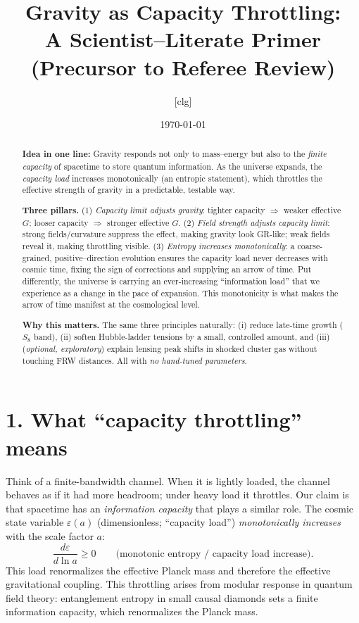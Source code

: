 \documentclass[aps,prd,onecolumn,superscriptaddress,nofootinbib]{revtex4-2}
\newcommand{\eps}{\varepsilon}
\begin{document}
\title{Gravity as Capacity Throttling:\\
A Scientist--Literate Primer (Precursor to Referee Review)}

\author{[clg]}
\affiliation{[Institution(s)]}
\date{\today}

\begin{abstract}
\textbf{Idea in one line:} Gravity responds not only to mass--energy but also to the \emph{finite capacity} of spacetime to store quantum information. As the universe expands, the \emph{capacity load} increases monotonically (an entropic statement), which throttles the effective strength of gravity in a predictable, testable way.

\smallskip
\textbf{Three pillars.}
(1) \emph{Capacity limit adjusts gravity}: tighter capacity $\Rightarrow$ weaker effective $G$; looser capacity $\Rightarrow$ stronger effective $G$.
(2) \emph{Field strength adjusts capacity limit}: strong fields/curvature suppress the effect, making gravity look GR-like; weak fields reveal it, making throttling visible. 
(3) \emph{Entropy increases monotonically}: a coarse-grained, positive--direction evolution ensures the capacity load never decreases with cosmic time, fixing the sign of corrections and supplying an arrow of time. Put differently, the universe is carrying an ever-increasing ``information load'' that we experience as a change in the pace of expansion. This monotonicity is what makes the arrow of time manifest at the cosmological level.

\smallskip
\textbf{Why this matters.} The same three principles naturally: (i) reduce late-time growth ($S_8$ band), (ii) soften Hubble-ladder tensions by a small, controlled amount, and (iii) (\emph{optional, exploratory}) explain lensing peak shifts in shocked cluster gas without touching FRW distances. All with \emph{no hand-tuned parameters}.
\end{abstract}

\maketitle

\section*{1. What ``capacity throttling'' means}
Think of a finite-bandwidth channel. When it is lightly loaded, the channel behaves as if it had more headroom; under heavy load it throttles. Our claim is that spacetime has an \emph{information capacity} that plays a similar role. The cosmic state variable $\eps(a)$ (dimensionless; ``capacity load'') \emph{monotonically increases} with the scale factor $a$:
\[
\frac{d\eps}{d\ln a} \ge 0 \qquad \text{(monotonic entropy / capacity load increase).}
\]
This load renormalizes the effective Planck mass and therefore the effective gravitational coupling.
This throttling arises from modular response in quantum field theory: entanglement entropy in small causal diamonds sets a finite information capacity, which renormalizes the Planck mass.
\end{document}

